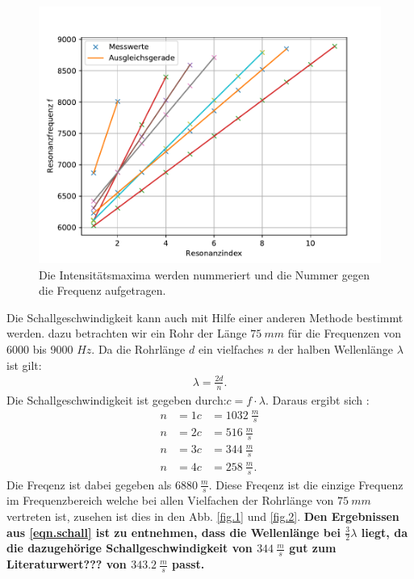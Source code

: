 \begin{figure}[h!]
  \centering
  \includegraphics[width=\textwidth]{linearfit.pdf}
  \caption{Die Intensitätsmaxima werden nummeriert und die Nummer gegen die Frequenz aufgetragen.}
  \label{fig.linearfit}
\end{figure}
\FloatBarrier
Die Schallgeschwindigkeit kann auch mit Hilfe einer anderen Methode bestimmt werden.
dazu betrachten wir ein Rohr der Länge $\SI{75}{mm}$ für die Frequenzen von 6000 bis 9000 $\si{Hz}$.
Da die Rohrlänge $d$ ein vielfaches $n$ der halben Wellenlänge $\lambda$ ist gilt:
\begin{align*}
  \lambda = \frac{2d}{n}.
\end{align*}
Die Schallgeschwindigkeit ist gegeben durch:$c=f \cdot \lambda$.
Daraus ergibt sich :
\begin{align}
  n&=1  c&=\SI{1032}{\frac{m}{s}}\\
  n&=2  c&=\SI{516}{\frac{m}{s}}\\
  n&=3  c&=\SI{344}{\frac{m}{s}}\\
  \label{eqn.schall}
  n&=4  c&=\SI{258}{\frac{m}{s}}.
\end{align}
Die Freqenz ist dabei gegeben als $\SI{6880}{\frac{m}{s}}$.
Diese Freqenz ist die einzige Frequenz im Frequenzbereich welche bei allen Vielfachen der Rohrlänge von $\SI{75}{mm}$ vertreten ist,
zusehen ist dies in den Abb. \ref{fig.1} und \ref{fig.2}.
\textbf{\huge{Den Ergebnissen aus \ref{eqn.schall} ist zu entnehmen, dass die Wellenlänge bei $\frac{3}{2}\lambda$ liegt, da die dazugehörige Schallgeschwindigkeit von $\SI{344}{\frac{m}{s}}$ gut zum Literaturwert??? von $\SI{343.2}{\frac{m}{s}}$ passt.}}

